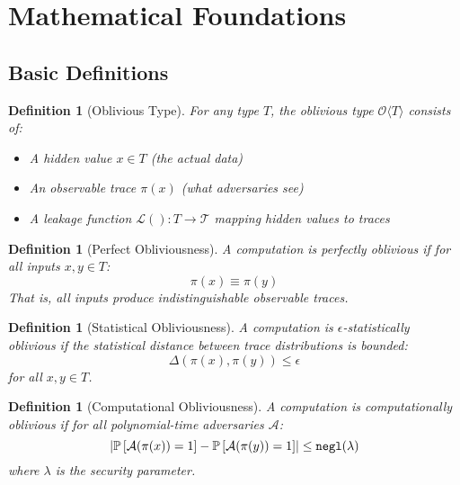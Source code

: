 \documentclass[11pt,final]{article}
\newtheorem{definition}[theorem]{Definition}
\newcommand{\Oblivious}[1]{\mathcal{O}\langle #1 \rangle}
\renewcommand{\Pattern}[1]{\pi(#1)}
\newcommand{\Leakage}[1]{\mathcal{L}(#1)}
\renewcommand{\negl}[1]{\mathtt{negl}(#1)}
\newcommand{\Adversary}{\mathcal{A}}
\begin{document}
\section{Mathematical Foundations}

\subsection{Basic Definitions}

\begin{definition}[Oblivious Type]
For any type $T$, the oblivious type $\Oblivious{T}$ consists of:
\begin{itemize}
    \item A hidden value $x \in T$ (the actual data)
    \item An observable trace $\Pattern{x}$ (what adversaries see)
    \item A leakage function $\Leakage{}: T \to \mathcal{T}$ mapping hidden values to traces
\end{itemize}
\end{definition}

\begin{definition}[Perfect Obliviousness]
A computation is \emph{perfectly oblivious} if for all inputs $x, y \in T$:
\begin{equation}
\Pattern{x} \equiv \Pattern{y}
\end{equation}
That is, all inputs produce indistinguishable observable traces.
\end{definition}

\begin{definition}[Statistical Obliviousness]
A computation is $\epsilon$-statistically oblivious if the statistical distance between trace distributions is bounded:
\begin{equation}
\Delta(\Pattern{x}, \Pattern{y}) \leq \epsilon
\end{equation}
for all $x, y \in T$.
\end{definition}

\begin{definition}[Computational Obliviousness]
A computation is computationally oblivious if for all polynomial-time adversaries $\Adversary$:
\begin{equation}
\left|\Prob{\Adversary(\Pattern{x}) = 1} - \Prob{\Adversary(\Pattern{y}) = 1}\right| \leq \negl{\lambda}
\end{equation}
where $\lambda$ is the security parameter.
\end{definition}
\end{document}
